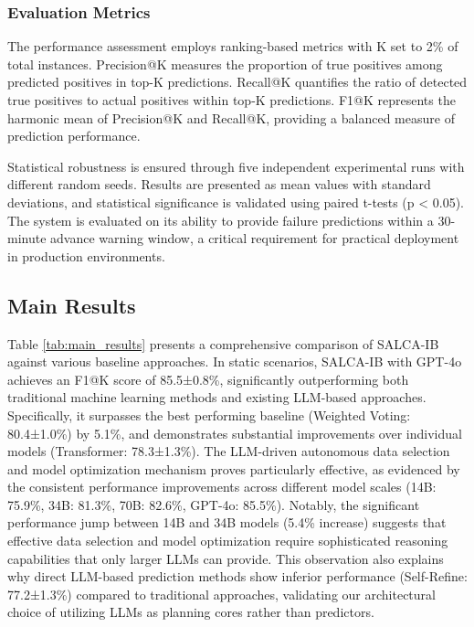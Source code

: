 \documentclass[conference]{IEEEtran}
\begin{document}
\subsubsection{Evaluation Metrics}
The performance assessment employs ranking-based metrics with K set to 2\% of total instances. Precision@K measures the proportion of true positives among predicted positives in top-K predictions. Recall@K quantifies the ratio of detected true positives to actual positives within top-K predictions. F1@K represents the harmonic mean of Precision@K and Recall@K, providing a balanced measure of prediction performance.

Statistical robustness is ensured through five independent experimental runs with different random seeds. Results are presented as mean values with standard deviations, and statistical significance is validated using paired t-tests (p < 0.05). The system is evaluated on its ability to provide failure predictions within a 30-minute advance warning window, a critical requirement for practical deployment in production environments.


\subsection{Main Results}
Table \ref{tab:main_results} presents a comprehensive comparison of SALCA-IB against various baseline approaches. In static scenarios, SALCA-IB with GPT-4o achieves an F1@K score of 85.5±0.8\%, significantly outperforming both traditional machine learning methods and existing LLM-based approaches. Specifically, it surpasses the best performing baseline (Weighted Voting: 80.4±1.0\%) by 5.1\%, and demonstrates substantial improvements over individual models (Transformer: 78.3±1.3\%). The LLM-driven autonomous data selection and model optimization mechanism proves particularly effective, as evidenced by the consistent performance improvements across different model scales (14B: 75.9\%, 34B: 81.3\%, 70B: 82.6\%, GPT-4o: 85.5\%). Notably, the significant performance jump between 14B and 34B models (5.4\% increase) suggests that effective data selection and model optimization require sophisticated reasoning capabilities that only larger LLMs can provide. This observation also explains why direct LLM-based prediction methods show inferior performance (Self-Refine: 77.2±1.3\%) compared to traditional approaches, validating our architectural choice of utilizing LLMs as planning cores rather than predictors.
\end{document}

